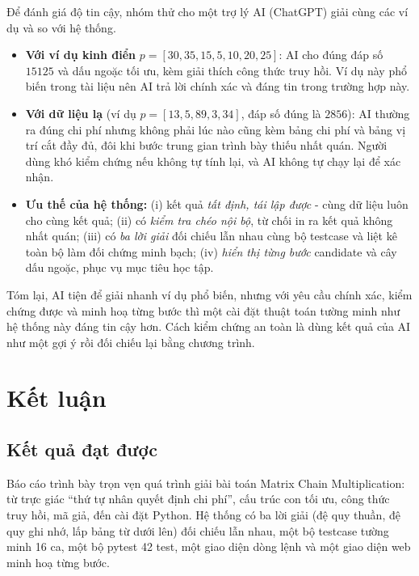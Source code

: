 \documentclass[12pt,a4paper]{article}
\begin{document}
Để đánh giá độ tin cậy, nhóm thử cho một trợ lý AI (ChatGPT) giải cùng các ví dụ và so với hệ thống.
\begin{itemize}
  \item \textbf{Với ví dụ kinh điển} $p = [30, 35, 15, 5, 10, 20, 25]$: AI cho đúng đáp số $15125$ và dấu ngoặc tối ưu, kèm giải thích công thức truy hồi. Ví dụ này phổ biến trong tài liệu nên AI trả lời chính xác và đáng tin trong trường hợp này.
  \item \textbf{Với dữ liệu lạ} (ví dụ $p = [13, 5, 89, 3, 34]$, đáp số đúng là $2856$): AI thường ra đúng chi phí nhưng không phải lúc nào cũng kèm bảng chi phí và bảng vị trí cắt đầy đủ, đôi khi bước trung gian trình bày thiếu nhất quán. Người dùng khó kiểm chứng nếu không tự tính lại, và AI không tự chạy lại để xác nhận.
  \item \textbf{Ưu thế của hệ thống:} (i) kết quả \emph{tất định, tái lập được} - cùng dữ liệu luôn cho cùng kết quả; (ii) có \emph{kiểm tra chéo nội bộ}, từ chối in ra kết quả không nhất quán; (iii) có \emph{ba lời giải} đối chiếu lẫn nhau cùng bộ testcase và liệt kê toàn bộ làm đối chứng minh bạch; (iv) \emph{hiển thị từng bước} candidate và cây dấu ngoặc, phục vụ mục tiêu học tập.
\end{itemize}
Tóm lại, AI tiện để giải nhanh ví dụ phổ biến, nhưng với yêu cầu chính xác, kiểm chứng được và minh hoạ từng bước thì một cài đặt thuật toán tường minh như hệ thống này đáng tin cậy hơn. Cách kiểm chứng an toàn là dùng kết quả của AI như một gợi ý rồi đối chiếu lại bằng chương trình.

\section{Kết luận}

\subsection{Kết quả đạt được}
Báo cáo trình bày trọn vẹn quá trình giải bài toán Matrix Chain Multiplication: từ trực giác \enquote{thứ tự nhân quyết định chi phí}, cấu trúc con tối ưu, công thức truy hồi, mã giả, đến cài đặt Python. Hệ thống có ba lời giải (đệ quy thuần, đệ quy ghi nhớ, lấp bảng từ dưới lên) đối chiếu lẫn nhau, một bộ testcase tường minh 16 ca, một bộ pytest 42 test, một giao diện dòng lệnh và một giao diện web minh hoạ từng bước.
\end{document}
